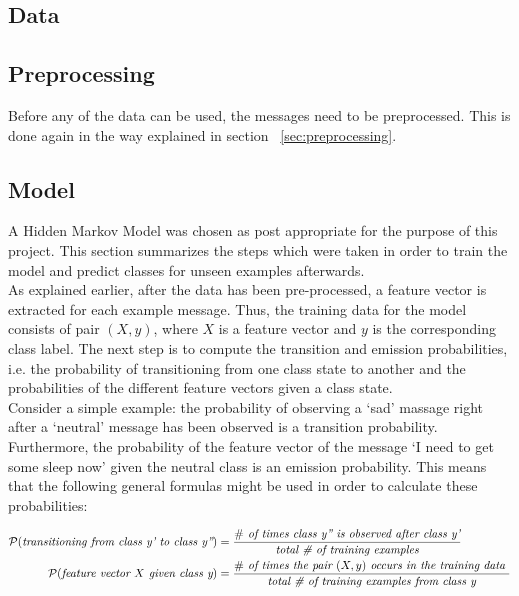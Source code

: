 \documentclass{article} %
\begin{document}
\subsection{Data}


\subsection{Preprocessing}

Before any of the data can be used, the messages need to be preprocessed. This is done again in the way explained in section ~\ref{sec:preprocessing}. 



\subsection{Model}


A Hidden Markov Model was chosen as post appropriate for the purpose of this project. This section summarizes the steps which were taken in order to train the model and predict classes for unseen examples afterwards. \\

\noindent As explained earlier, after the data has been pre-processed, a feature vector is extracted for each example message. Thus, the training data for the model consists of pair $(X, y)$, where $X$ is a feature vector and $y$ is the corresponding class label. The next step is to compute the transition and emission probabilities, i.e. the probability of transitioning from one class state to another and the probabilities of the different feature vectors given a class state. \\

\noindent  Consider a simple example: the probability of observing a `sad' massage right after a `neutral' message has been observed is a transition probability. Furthermore, the probability of the feature vector of the message `I need to get some sleep now' given the neutral class is an emission probability. This means that the following general formulas might be used in order to calculate these probabilities:

\begin{align*}
\cal{P} (\textit{transitioning from class y' to class y''}) 
&= \frac {\# \textit{ of times class y'' is observed after class y'}} {\textit {total \# of training examples}} \\
\cal{P} (\textit{feature vector $X$ given class y}) 
&= \frac {\# \textit{ of times the pair $(X, y)$ occurs in the training data }} {\textit {total \# of training examples from class y}} \\
\end{align*}
\end{document}
